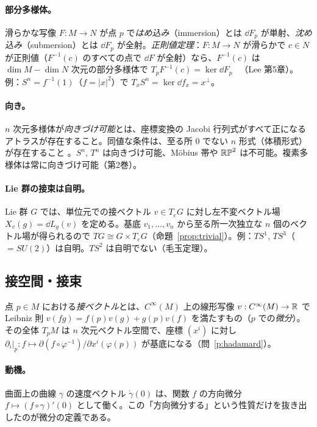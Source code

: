 \paragraph{部分多様体。}滑らかな写像 $F:M\to N$ が点 $p$ で\emph{はめ込み}（immersion）とは $\dd F_p$ が単射、\emph{沈め込み}（submersion）とは $\dd F_p$ が全射。\emph{正則値定理}：$F:M\to N$ が滑らかで $c\in N$ が正則値（$F^{-1}(c)$ のすべての点で $\dd F$ が全射）なら、$F^{-1}(c)$ は $\dim M-\dim N$ 次元の部分多様体で $T_p F^{-1}(c)=\ker\dd F_p$ \tC\ （Lee 第5章）。例：$S^n=f^{-1}(1)$（$f=|x|^2$）で $T_xS^n=\ker\dd f_x=x^\perp$。

\paragraph{向き。}$n$ 次元多様体が\emph{向きづけ可能}とは、座標変換の Jacobi 行列式がすべて正になるアトラスが存在すること。同値な条件は、至る所 $0$ でない $n$ 形式（体積形式）が存在すること \tC。$S^n$, $T^n$ は向きづけ可能、Möbius 帯や $\mathbb{RP}^2$ は不可能。複素多様体は常に向きづけ可能（第2巻）。

\paragraph{Lie 群の接束は自明。}Lie 群 $G$ では、単位元での接ベクトル $v\in T_eG$ に対し左不変ベクトル場 $X_v(g)=\dd L_g(v)$ を定める。基底 $v_1,\dots,v_n$ から至る所一次独立な $n$ 個のベクトル場が得られるので $TG\cong G\times T_eG$（命題~\ref{prop:trivial}）。例：$TS^1$, $TS^3$（$=SU(2)$）は自明。$TS^2$ は自明でない（毛玉定理）。

\subsection{接空間・接束}
\begin{defn}[接ベクトル]
点 $p\in M$ における\emph{接ベクトル}とは、$C^\infty(M)$ 上の線形写像 $v:C^\infty(M)\to\mathbb R$ で Leibniz 則 $v(fg)=f(p)v(g)+g(p)v(f)$ を満たすもの（$p$ での\emph{微分}）。その全体 $T_pM$ は $n$ 次元ベクトル空間で、座標 $(x^i)$ に対し $\partial_i|_p:f\mapsto \partial(f\circ\varphi^{-1})/\partial x^i(\varphi(p))$ が基底になる（問~\ref{p:hadamard}）。
\end{defn}

\paragraph{動機。}曲面上の曲線 $\gamma$ の速度ベクトル $\dot\gamma(0)$ は、関数 $f$ の方向微分 $f\mapsto (f\circ\gamma)'(0)$ として働く。この「方向微分する」という性質だけを抜き出したのが微分の定義である。

